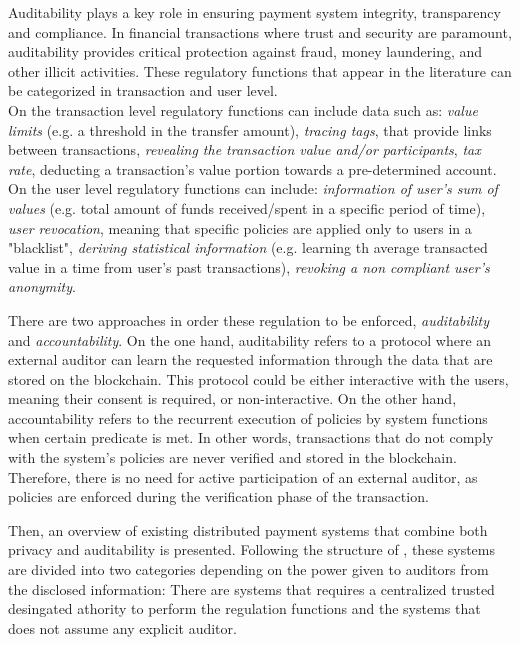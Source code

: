 
Auditability plays a key role in ensuring payment system integrity, transparency and compliance. 
In financial transactions where trust and security are paramount, auditability provides critical protection against fraud, money laundering, and other illicit activities.
These regulatory functions that appear in the literature can be categorized in transaction and user level.\\
On the transaction level regulatory functions can include data such as: 
\emph{value limits} (e.g. a threshold in the transfer amount), 
\emph{tracing tags}, that provide links between transactions,
\emph{revealing the transaction value and/or participants},
\emph{tax rate}, deducting a transaction's value portion towards a pre-determined account.\\
On the user level regulatory functions can include:
\emph{information of user's sum of values} (e.g. total amount of funds received/spent in a specific period of time),
\emph{user revocation}, meaning that specific policies are applied only to users in a "blacklist",
\emph{deriving statistical information} (e.g. learning th average transacted value in a time from user's past transactions),
\emph{revoking a non compliant user's anonymity}.

There are two approaches in order these regulation to be enforced, \emph{auditability} and \emph{accountability}.
On the one hand, auditability refers to a protocol where an external auditor can learn the requested information through the data that are stored on the blockchain.
This protocol could be either interactive with the users, meaning their consent is required, or non-interactive.
On the other hand, accountability refers to the recurrent execution of policies by system functions when certain predicate is met.
In other words, transactions that do not comply with the system's policies are never verified and stored in the blockchain.
Therefore, there is no need for active participation of an external auditor, as policies are enforced during the verification phase of the transaction. 

Then, an overview of existing distributed payment systems that combine both privacy and auditability is presented.
Following the structure of \cite{SokAuditability}, these systems are divided into two categories depending on the power given to auditors from the disclosed information:
There are systems that requires a centralized trusted desingated athority to perform the regulation functions and the systems that does not assume any explicit auditor.

